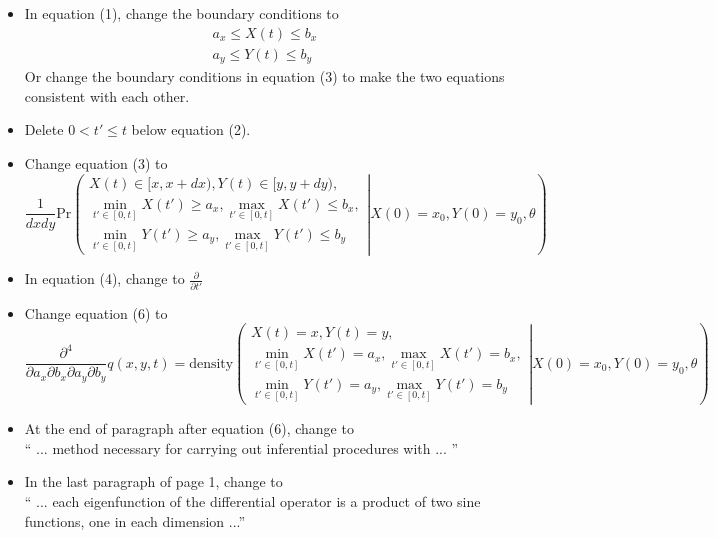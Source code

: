 \documentclass[12pt]{article}
\begin{document}
\begin{itemize}

\item In equation (1), change the boundary conditions to 
$$ \begin{array}{cc}
a_x \le X(t) \le b_x \\
a_y \le Y(t) \le b_y
\end{array}$$
Or change the boundary conditions in equation (3) to make the two equations 
consistent with each other. 

\item Delete $0 < t' \le t$ below equation (2). 

\item Change equation (3) to 
$$\frac{1}{dx dy} \mbox{Pr}\left( \left. \begin{array}{ll}
X(t) \in [x, x+dx), Y(t) \in [y, y+dy),  \\
\displaystyle \min_{t'\in[0, t]} X(t') \ge a_x, \max_{t'\in[0, t]} X(t') \le b_x, \\
\displaystyle \min_{t'\in[0, t]} Y(t') \ge a_y, \max_{t'\in[0, t]} Y(t') \le b_y
\end{array} \right | X(0)=x_0, Y(0)=y_0, \theta
\right) $$

\item In equation (4), change to $\displaystyle \frac{\partial}{\partial t'} $ 

\item Change equation (6) to 
$$ \frac{\partial^4}{\partial a_x \partial b_x \partial a_y \partial b_y} q(x,y,t) = 
\mbox{density} \left( \left. \begin{array}{ll}
X(t) =x, Y(t) =y,  \\
\displaystyle \min_{t'\in[0, t]} X(t') = a_x, \max_{t'\in[0, t]} X(t') = b_x, \\
\displaystyle \min_{t'\in[0, t]} Y(t') = a_y, \max_{t'\in[0, t]} Y(t') = b_y
\end{array} \right | X(0)=x_0, Y(0)=y_0, \theta
\right) $$

\item At the end of paragraph after equation (6), change to \\
`` ... method necessary for carrying out inferential procedures with ... ''

\item In the last paragraph of page 1, change to \\
`` ... each eigenfunction of the differential operator is a product of two sine functions, one in each dimension ...'' \\


\end{itemize}
\end{document}
